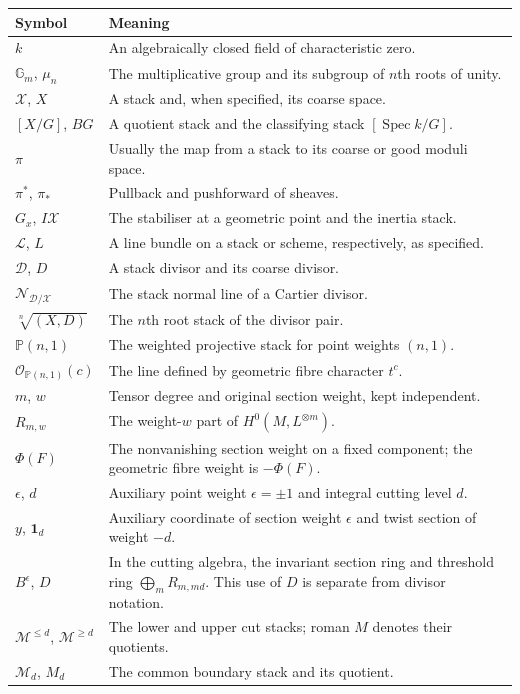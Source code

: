 \documentclass[11pt,a4paper]{article}
\numberwithin{equation}{section}
\theoremstyle{definition}
\newcommand{\PP}{\mathbb P}
\newcommand{\Gm}{\mathbb G_m}
\newcommand{\OO}{\mathcal O}
\newcommand{\cX}{\mathcal X}
\newcommand{\cD}{\mathcal D}
\newcommand{\cL}{\mathcal L}
\newcommand{\cM}{\mathcal M}
\newcommand{\Spec}{\operatorname{Spec}}
\newcommand{\one}{\mathbf 1}
\newcommand{\normal}{\mathcal N}
\begin{document}
\begin{longtable}{@{}p{}p{}@{}}
\toprule
Symbol & Meaning\\
\midrule
\endhead
$k$ & An algebraically closed field of characteristic zero.\\
$\Gm$, $\mu_n$ & The multiplicative group and its subgroup of $n$th roots of unity.\\
$\cX$, $X$ & A stack and, when specified, its coarse space.\\
$[X/G]$, $BG$ & A quotient stack and the classifying stack $[\Spec k/G]$.\\
$\pi$ & Usually the map from a stack to its coarse or good moduli space.\\
$\pi^*$, $\pi_*$ & Pullback and pushforward of sheaves.\\
$G_x$, $I\cX$ & The stabiliser at a geometric point and the inertia stack.\\
$\cL$, $L$ & A line bundle on a stack or scheme, respectively, as specified.\\
$\cD$, $D$ & A stack divisor and its coarse divisor.\\
$\normal_{\cD/\cX}$ & The stack normal line of a Cartier divisor.\\
$\sqrt[n]{(X,D)}$ & The $n$th root stack of the divisor pair.\\
$\PP(n,1)$ & The weighted projective stack for point weights $(n,1)$.\\
$\OO_{\PP(n,1)}(c)$ & The line defined by geometric fibre character $t^c$.\\
$m$, $w$ & Tensor degree and original section weight, kept independent.\\
$R_{m,w}$ & The weight-$w$ part of $H^0(M,L^{\otimes m})$.\\
$\Phi(F)$ & The nonvanishing section weight on a fixed component; the geometric fibre weight is $-\Phi(F)$.\\
$\epsilon$, $d$ & Auxiliary point weight $\epsilon=\pm1$ and integral cutting level $d$.\\
$y$, $\one_d$ & Auxiliary coordinate of section weight $\epsilon$ and twist section of weight $-d$.\\
$B^\epsilon$, $D$ & In the cutting algebra, the invariant section ring and threshold ring $\bigoplus_mR_{m,md}$. This use of $D$ is separate from divisor notation.\\
$\cM^{\le d}$, $\cM^{\ge d}$ & The lower and upper cut stacks; roman $M$ denotes their quotients.\\
$\cM_d$, $M_d$ & The common boundary stack and its quotient.\\
\bottomrule
\end{longtable}
\end{document}
